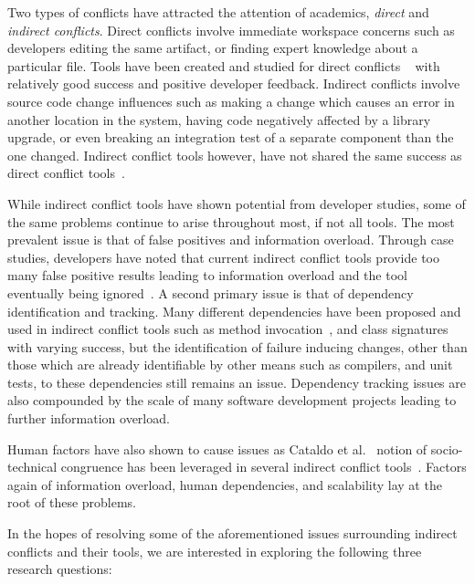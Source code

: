 \documentclass[conference]{IEEEtran}
\begin{document}
Two types of conflicts have attracted the attention of academics, \textit{direct} and 
\textit{indirect conflicts}. Direct conflicts involve immediate workspace concerns such as developers editing the same
artifact, or finding expert knowledge about a particular file. Tools have been created and studied for direct conflicts
~\cite{Xiang:2008:ERT, Biehl:2007:FVD, Sarma:2009:TIV, Khurana:2009:PFC} with relatively good success and 
positive developer feedback. Indirect conflicts involve source code change influences such as making a change which
causes an error in another location in the system, having code negatively affected by a library upgrade, or even
breaking an integration test of a separate component than the one changed. Indirect conflict tools however, have
not shared the same success as direct conflict 
tools~\cite{Sarma:2007:TSA, Holmes:2010:CAR, Trainer:2005:BGT, Servant:2010:CPI, Borici:2012:CHA}.

While indirect conflict tools have shown potential from developer studies, some of the same problems continue
to arise throughout most, if not all tools. The most prevalent issue is that of false positives and information
overload. Through case studies, developers have noted that current indirect conflict tools provide too many 
false positive results leading to information overload and the tool eventually being
ignored~\cite{Sarma:2007:TSA, Servant:2010:CPI}. A second primary issue is that of dependency identification and
tracking. Many different dependencies have been proposed and used in indirect conflict tools such as method 
invocation~\cite{Trainer:2005:BGT}, and class signatures~\cite{Sarma:2007:TSA} with varying success, but the 
identification of failure inducing changes, other than those which are already identifiable by other means such
as compilers, and unit tests, to these dependencies still remains an issue. Dependency tracking issues are
also compounded by the scale of many software development projects leading to further information overload.

Human factors have also shown to cause issues as Cataldo et al.~\cite{Cataldo:2006:ICR} notion of socio-technical
congruence has been leveraged in several indirect conflict tools~\cite{Kwan:2011:ESC, Begel:2010:CDE, Borici:2012:CHA}.
Factors again of information overload, human dependencies, and scalability lay at the root of these problems.

In the hopes of resolving some of the aforementioned issues surrounding indirect conflicts and their tools, we 
are interested in exploring the following three research questions: 
\end{document}

